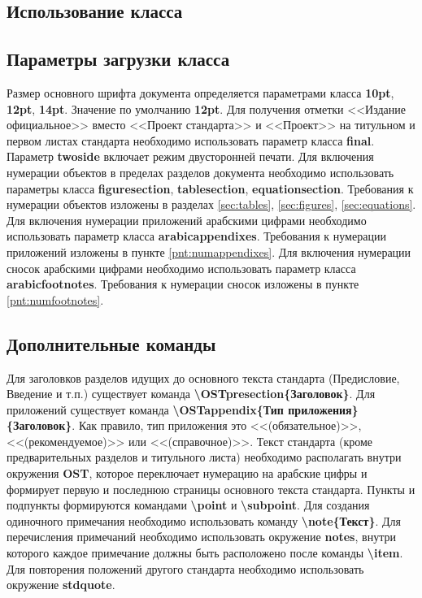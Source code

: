 \documentclass[12pt, twoside, final]{ruost}
\newcommand{\txtcmd}[1]{\textbf{\backslash{}#1}}
\begin{document}
	\begin{OST}
		
		\section{Использование класса}
				
			\subsection{Параметры загрузки класса}\label{sec:args}
			
				\point Размер основного шрифта документа определяется параметрами класса  \textbf{10pt}, \textbf{12pt}, \textbf{14pt}. Значение по умолчанию \textbf{12pt}.
				\point Для получения отметки <<Издание официальное>> вместо <<Проект стандарта>> и <<Проект>> на титульном и первом листах стандарта необходимо использовать параметр класса \textbf{final}.
				\point Параметр \textbf{twoside} включает режим двусторонней печати.
				\point Для включения нумерации объектов в пределах разделов документа необходимо использовать параметры класса \textbf{figuresection}, \textbf{tablesection}, \textbf{equationsection}.
					\subpoint Требования к нумерации объектов изложены в разделах \ref{sec:tables}, \ref{sec:figures}, \ref{sec:equations}.
				\point Для включения нумерации приложений арабскими цифрами необходимо использовать параметр класса \textbf{arabicappendixes}.
					\subpoint Требования к нумерации приложений изложены в пункте \ref{pnt:numappendixes}.
				\point Для включения нумерации сносок арабскими цифрами необходимо использовать параметр класса \textbf{arabicfootnotes}.
				\subpoint Требования к нумерации сносок изложены в пункте \ref{pnt:numfootnotes}.
				
			
			\subsection{Дополнительные команды}\label{sec:commands}
			
				\point Для заголовков разделов идущих до основного текста стандарта (Предисловие, Введение и т.п.) существует команда \txtcmd{OSTpresection\{Заголовок\}}.
				\point Для приложений существует команда \txtcmd{OSTappendix\{Тип приложения\} \{Заголовок\}}.
				\subpoint Как правило, тип приложения это <<(обязательное)>>, <<(рекомендуемое)>> или <<(справочное)>>.
				\point Текст стандарта (кроме предварительных разделов и титульного листа) необходимо располагать внутри окружения \textbf{OST}, которое переключает нумерацию на арабские цифры и формирует первую и последнюю страницы основного текста стандарта.
				\point Пункты и подпункты формируются командами \txtcmd{point} и \txtcmd{subpoint}.
				\point Для создания одиночного примечания необходимо использовать команду \txtcmd{note\{Текст\}}.
				\point Для перечисления примечаний необходимо использовать окружение \textbf{notes}, внутри которого каждое примечание должны быть расположено после команды \txtcmd{item}.
				\point Для повторения положений другого стандарта необходимо использовать окружение \textbf{stdquote}.
				

\end{OST}
\end{document}
